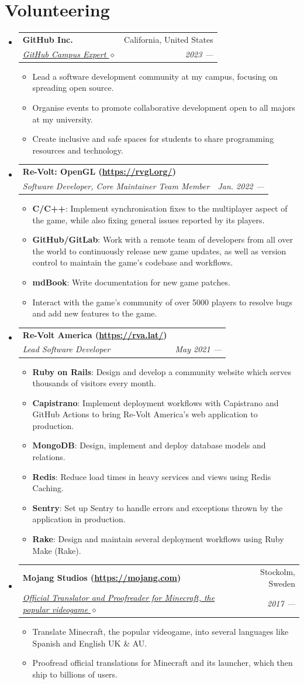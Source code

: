 \documentclass[letterpaper,11pt]{article}
\makeatletter
\newcommand{\resumeItem}[2]{
	\item\small{
		\textbf{#1}{: #2 \vspace{-2pt}}
	}
}
\newcommand{\resumeSubheading}[4]{
	\vspace{-1pt}\item
	\begin{tabular*}{0.97\textwidth}[t]{l@{\extracolsep{\fill}}r}
		\textbf{#1} & #2 \\
		\textit{\small#3} & \textit{\small #4} \\
	\end{tabular*}\vspace{-5pt}
}
\newcommand{\resumeSubHeadingListStart}{\begin{itemize}[leftmargin=*]}
\newcommand{\resumeSubHeadingListEnd}{\end{itemize}}
\newcommand{\resumeItemListStart}{\begin{itemize}}
\newcommand{\resumeItemListEnd}{\end{itemize}\vspace{-5pt}}
\makeatother
\begin{document}
	\section{Volunteering}
	\resumeSubHeadingListStart
	\resumeSubheading
	{GitHub Inc.}{California, United States}
	{\href{https://githubcampus.expert/BGMP}{GitHub Campus Expert $\diamond$}}{2023 ---}
	\resumeItemListStart
	\item{Lead a software development community at my campus, focusing on spreading open source.}
	\item{Organise events to promote collaborative development open to all majors at my university.}
	\item{Create inclusive and safe spaces for students to share programming resources and technology.}
	\resumeItemListEnd
	\resumeSubheading
	{Re-Volt: OpenGL (\textnormal{\url{https://rvgl.org/}})}{}
	{Software Developer, Core Maintainer Team Member}{Jan. 2022 ---}
	\resumeItemListStart
	\resumeItem{C/C++}{Implement synchronisation fixes to the multiplayer aspect of the game, while also fixing general issues reported by its players.}
	\resumeItem{GitHub/GitLab}{Work with a remote team of developers from all over the world to continuously release new game updates, as well as version control to maintain the game's codebase and workflows.}
	\resumeItem{mdBook}{Write documentation for new game patches.}
	\item{Interact with the game's community of over 5000 players to resolve bugs and add new features to the game.}
	\resumeItemListEnd
	\resumeSubheading
	{Re-Volt America (\textnormal{\url{https://rva.lat/}})}{}
	{Lead Software Developer}{May 2021 ---}
	\resumeItemListStart
	\resumeItem{Ruby on Rails}{Design and develop a community website which serves thousands of visitors every month.}
	\resumeItem{Capistrano}{Implement deployment workflows with Capistrano and GitHub Actions to bring Re-Volt America's web application to production.}
	\resumeItem{MongoDB}{Design, implement and deploy database models and relations.}
	\resumeItem{Redis}{Reduce load times in heavy services and views using Redis Caching.}
	\resumeItem{Sentry}{Set up Sentry to handle errors and exceptions thrown by the application in production.}
	\resumeItem{Rake}{Design and maintain several deployment workflows using Ruby Make (Rake).}
	\resumeItemListEnd
	\resumeSubheading
	{Mojang Studios (\textnormal{\url{https://mojang.com}})}{Stockolm, Sweden}
	{\href{https://crowdin.com/profile/bgm}{Official Translator and Proofreader for Minecraft, the popular videogame $\diamond$}}{2017 ---}
	\resumeItemListStart
	\item{Translate Minecraft, the popular videogame, into several languages like Spanish and English UK \& AU.}
	\item{Proofread official translations for Minecraft and its launcher, which then ship to billions of users.}
	\resumeItemListEnd
	\resumeSubHeadingListEnd
	
\end{document}
